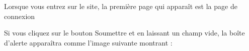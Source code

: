 \documentclass{article}
\begin{document}
\begin{enumerate}
	Lorsque vous entrez sur le site, la première page qui apparaît est la page de connexion
	
	\hspace*{-0.7in}
               \noindent{}
               
               
               
               \vspace{4cm}
               
               
    Si vous cliquez sur le bouton Soumettre et en laissant un champ vide, la boîte d'alerte apparaîtra comme l'image suivante montrant :
   \vspace{0.7cm}
   
\hspace*{-0.7in}

               \noindent{}


\end{enumerate}
\end{document}
